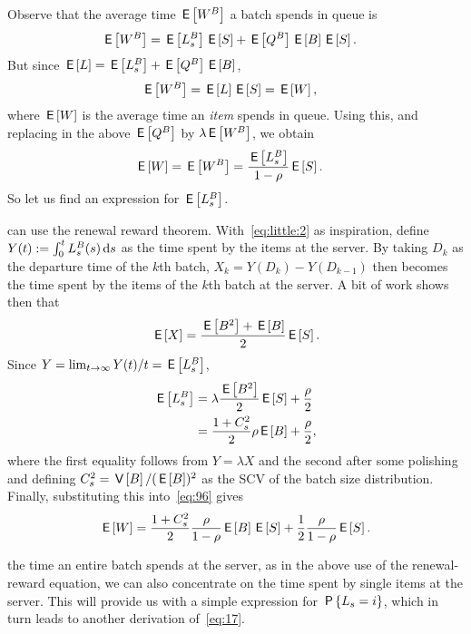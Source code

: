 Observe that the average time $\,\mathsf{E}\left[W^{B}\right]$ a batch spends in queue is
\begin{align*}
  \,\mathsf{E}\left[W^B\right] &=  \,\mathsf{E}\left[L_s^B\right]\,\mathsf{E}\left[S\right] + \,\mathsf{E}\left[Q^B\right] \,\mathsf{E}\left[B\right] \,\mathsf{E}\left[S\right].
\end{align*}
But since $\,\mathsf{E}\left[L\right] = \,\mathsf{E}\left[L_s^B\right] + \,\mathsf{E}\left[Q^B\right] \,\mathsf{E}\left[B\right]$,
\begin{align*}
  \,\mathsf{E}\left[W^B\right] &=  \,\mathsf{E}\left[L\right] \,\mathsf{E}\left[S\right] = \,\mathsf{E}\left[W\right],
\end{align*}
where $\,\mathsf{E}\left[W\right]$ is the average time an \emph{item} spends in queue.
Using this, and replacing in the above $\,\mathsf{E}\left[Q^B\right]$ by $\lambda \,\mathsf{E}\left[W^B\right]$, we obtain
\begin{align}\label{eq:96}
\,\mathsf{E}\left[W\right] =  \,\mathsf{E}\left[W^B\right] &= \frac{\,\mathsf{E}\left[L_s^B\right]}{1-\rho}\,\mathsf{E}\left[S\right].
\end{align}
So let us find an expression for $\,\mathsf{E}\left[L_s^B\right]$.

 can use the renewal reward theorem.
With~\cref{eq:little:2} as inspiration, define $Y(t) := \int_0^t L_s^B(s) \,\textrm{d}s$ as the time spent by the items at the server.
By taking $D_k$ as the departure time of the $k$th batch, $X_k = Y(D_k)-Y(D_{k-1})$ then becomes the time spent by the items of the $k$th batch at the server.
A bit of work shows then that
\begin{equation}\label{eq:9}
  \,\mathsf{E}\left[X\right] = \frac{\,\mathsf{E}\left[B^2\right]+\,\mathsf{E}\left[B\right]}2 \,\mathsf{E}\left[S\right].
\end{equation}
Since $Y=\lim_{t\to\infty} Y(t)/t = \,\mathsf{E}\left[L_s^{B}\right]$,
\begin{align}
  \,\mathsf{E}\left[L_s^B\right] &= \lambda \frac{\,\mathsf{E}\left[B^2\right]}2\,\mathsf{E}\left[S\right] + \frac\rho 2 \label{eq:17}\\
  &= \frac{1+C_s^2}2 \rho \,\mathsf{E}\left[B\right] + \frac{\rho}{2},\label{eq:mxm1:1}
\end{align}
where the first equality  follows from $Y=\lambda X$ and the second after some polishing and defining $C_s^2 = \,\mathsf{V}\left[B\right]/ (\,\mathsf{E}\left[B\right])^{2}$ as the SCV of the batch size distribution. Finally, substituting this into~\cref{eq:96} gives
\begin{equation}\label{eq:43}
\,\mathsf{E}\left[W\right] =
\frac{1+C_s^2}2 \frac{\rho}{1-\rho} \,\mathsf{E}\left[B\right] \,\mathsf{E}\left[S\right] + \frac12\frac\rho{1-\rho} \,\mathsf{E}\left[S\right].
\end{equation}


 the time an entire batch spends at the server, as in the above use of the renewal-reward equation, we can also concentrate on the time spent by single items at the server.
This will provide us with a simple expression for $\,\mathsf{P}\left\{L_s=i\right\}$, which in turn leads to another derivation of~\cref{eq:17}.

